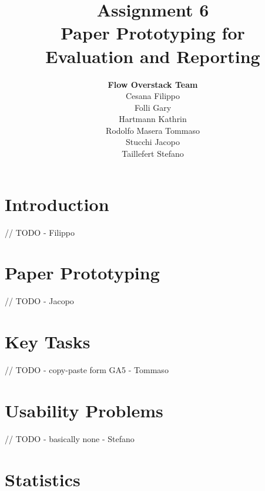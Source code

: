 \documentclass[12pt]{scrartcl}
\title{Assignment 6\\ Paper Prototyping for\\ Evaluation and Reporting}
\author{\textbf{Flow Overstack Team}\\ Cesana Filippo\\ Folli Gary\\ Hartmann Kathrin\\ Rodolfo Masera Tommaso\\ Stucchi Jacopo\\ Taillefert Stefano}
\date{}
\begin{document}
\maketitle

\tableofcontents

\newpage

\section{Introduction}

	
	// TODO - Filippo
	
	
\section{Paper Prototyping}

	
	// TODO - Jacopo
	
	
\section{Key Tasks}

	
	// TODO - copy-paste form GA5 - Tommaso
	

\section{Usability Problems}

	
	// TODO - basically none - Stefano
	
	
\section{Statistics}

\end{document}
